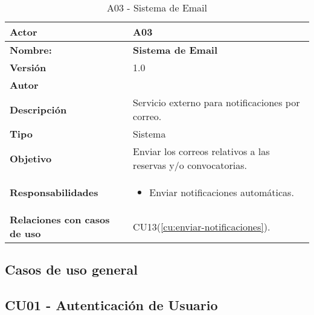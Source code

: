 \begin{table}[H]
	\centering
	\begin{tabularx}{\linewidth}{ p{} p{} }
		\toprule
		\textbf{Actor}    & A03 \\
		\toprule
		\textbf{Nombre:} 			  & \textbf{Sistema de Email} \\
		\textbf{Versión}              & 1.0    \\
		\textbf{Autor}                & \nombre \\
		\textbf{Descripción}          & Servicio externo para notificaciones por correo. \\
		\textbf{Tipo}                 & Sistema \\
		\textbf{Objetivo}             & Enviar los correos relativos a las reservas y/o convocatorias. \\
		\textbf{Responsabilidades}    & 
		\begin{itemize}
			\tightlist
			\item Enviar notificaciones automáticas.
		\end{itemize}\\
		\textbf{Relaciones con casos de uso} & CU13(\ref{cu:enviar-notificaciones}). \\
		\bottomrule
	\end{tabularx}
	\caption{A03 - Sistema de Email}
	\label{actor:sistema-email}
\end{table}

\newpage

\subsection{Casos de uso general}



\subsection{CU01 - Autenticación de Usuario}

